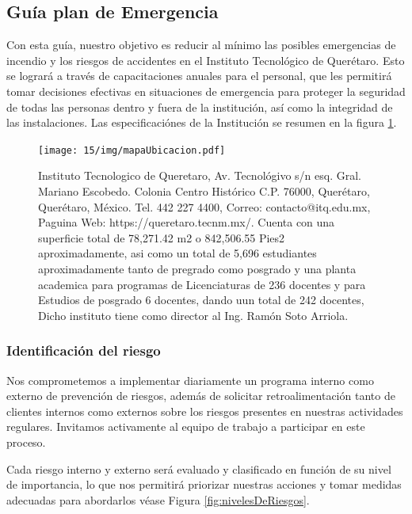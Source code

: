 \subsection{Guía plan de Emergencia}

Con esta guía, nuestro objetivo es reducir al mínimo las posibles emergencias de incendio y los riesgos de accidentes en el Instituto Tecnológico de Querétaro. Esto se logrará a través de capacitaciones anuales para el personal, que les permitirá tomar decisiones efectivas en situaciones de emergencia para proteger la seguridad de todas las personas dentro y fuera de la institución, así como la integridad de las instalaciones. Las especificaciónes de la Institución se resumen en la figura \ref{fig:mapaUbicacion}.

\begin{figure}[H]
    \centering
    \texttt{[image: 15/img/mapaUbicacion.pdf]}
    \caption{Instituto Tecnologico de Queretaro, Av. Tecnológivo s/n esq. Gral. Mariano Escobedo. Colonia Centro Histórico C.P. 76000, Querétaro, Querétaro, México. Tel. 442 227 4400, Correo: contacto@itq.edu.mx, Paguina Web: https://queretaro.tecnm.mx/. 
    Cuenta con una	superficie total de 78,271.42 m2 o 842,506.55 Pies2 aproximadamente, asi como un total de 5,696 estudiantes aproximadamente tanto de pregrado como posgrado y una planta academica para programas de Licenciaturas de 236 docentes y para Estudios de posgrado 6 docentes, dando uun total de 242 docentes, Dicho instituto tiene como director al Ing. Ramón Soto Arriola. }
    \label{fig:mapaUbicacion}
\end{figure}

\subsubsection{Identificación del riesgo}

Nos comprometemos a implementar diariamente un programa interno como externo de prevención de riesgos, además de solicitar retroalimentación tanto de clientes internos como externos sobre los riesgos presentes en nuestras actividades regulares. Invitamos activamente al equipo de trabajo a participar en este proceso.

Cada riesgo interno y externo será evaluado y clasificado en función de su nivel de importancia, lo que nos permitirá priorizar nuestras acciones y tomar medidas adecuadas para abordarlos véase Figura \ref{fig:nivelesDeRiesgos}.
 

